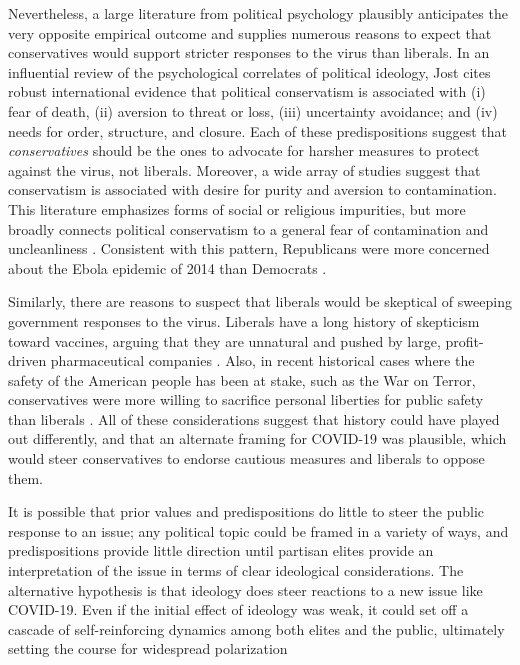 \documentclass{article} %
\begin{document}
Nevertheless, a large literature from political psychology plausibly
anticipates the very opposite empirical outcome and supplies numerous
reasons to expect that conservatives would support stricter responses to
the virus than liberals. In an influential review of the psychological
correlates of political ideology, Jost
\parencite{Jost2006-wm} cites robust
international evidence that political conservatism is associated with
(i) fear of death, (ii) aversion to threat or loss, (iii) uncertainty
avoidance; and (iv) needs for order, structure, and closure. Each of
these predispositions suggest that \emph{conservatives} should be the
ones to advocate for harsher measures to protect against the virus, not
liberals. Moreover, a wide array of studies suggest that conservatism is
associated with desire for purity and aversion to contamination. This
literature emphasizes forms of social or religious impurities, but more
broadly connects political conservatism to a general fear of
contamination and uncleanliness
\parencite{Haidt2012-fy, Helzer2011-ni, Jost2017-sj, Oxley2008-pi, Terrizzi2013-po}. Consistent with this pattern, Republicans
were more concerned about the Ebola epidemic of 2014 than Democrats
\parencite{Pew_Research_Center2014-gi}.

Similarly, there are reasons to suspect that liberals would be skeptical
of sweeping government responses to the virus. Liberals have a long
history of skepticism toward vaccines, arguing that they are unnatural
and pushed by large, profit-driven pharmaceutical companies
\parencite{Callaghan2019-zh, Colgrove2006-jy, Conis2014-qi, Jamison2019-yo}. Also, in recent historical cases where the safety of the
American people has been at stake, such as the War on Terror,
conservatives were more willing to sacrifice personal liberties for
public safety than liberals
\parencite{Rosentiel2011-pi}. All of
these considerations suggest that history could have played out
differently, and that an alternate framing for COVID-19 was plausible,
which would steer conservatives to endorse cautious measures and
liberals to oppose them.

It is possible that prior values and predispositions do little to steer
the public response to an issue; any political topic could be framed in
a variety of ways, and predispositions provide little direction until
partisan elites provide an interpretation of the issue in terms of clear
ideological considerations. The alternative hypothesis is that ideology
does steer reactions to a new issue like COVID-19. Even if the initial
effect of ideology was weak, it could set off a cascade of
self-reinforcing dynamics among both elites and the public, ultimately
setting the course for widespread polarization
\parencite{DellaPosta2020-ta, Rawlings2022-pw}
\end{document}
